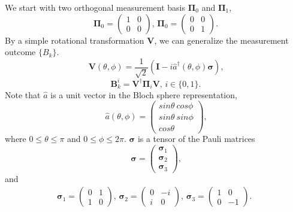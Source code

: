 \documentclass[%
 reprint,
 amsmath,amssymb,
 aps,
]{revtex4-1}
\begin{document}
We start with two orthogonal measurement basis $\boldsymbol{\Pi}_0$ and $\boldsymbol{\Pi}_1$,
\begin{equation}
\boldsymbol{\Pi}_0 = 
\left( \begin{array}{cc}
1 & 0 \\
0 & 0 \end{array} \right) \text{, }
\boldsymbol{\Pi}_0 = 
\left( \begin{array}{cc}
0 & 0 \\
0 & 1 \end{array} \right) \text{.}
\end{equation}
\noindent By a simple rotational transformation $\textbf{V}$, we can generalize the measurement outcome $\{B_k\}$.
\begin{equation}
\textbf{V}(\theta,\phi) = \frac{1}{\sqrt{2}} (\textbf{I} - i \hat{a}^{\dagger}(\theta,\phi) \boldsymbol{\sigma} ) \text{,}
\end{equation}
\begin{equation}
\textbf{B}_k^i  = \textbf{V}^{\dagger} \boldsymbol{\Pi}_i \textbf{V} \text{, } i \in \{0, 1\} \text{.}
\end{equation}
\noindent Note that $\hat{a}$ is a unit vector in the Bloch sphere representation,
\begin{equation}
\hat{a}(\theta,\phi) = \left( \begin{array}{c}
sin \theta \  cos \phi \\
sin \theta \  sin \phi \\
cos \theta
\end{array} \right) \text{,}
\end{equation}
\noindent where $0 \le \theta \le \pi$ and $0 \le \phi \le 2\pi$. $\boldsymbol{\sigma}$ is a tensor of the Pauli matrices
\begin{equation}
\boldsymbol{\sigma} = \left( \begin{array}{c}
\boldsymbol{\sigma}_1 \\
\boldsymbol{\sigma}_2 \\
\boldsymbol{\sigma}_3
\end{array} \right) \text{,}
\end{equation}
\noindent and
\begin{eqnarray}
\boldsymbol{\sigma}_1 = \left( \begin{array}{cc}
0 & 1 \\
1 & 0
\end{array} \right) \text{, }
\boldsymbol{\sigma}_2 = \left( \begin{array}{cc}
0 & -i \\
i & 0
\end{array} \right) \text{, }
\boldsymbol{\sigma}_3 = \left( \begin{array}{cc}
1 & 0 \\
0 & -1
\end{array} \right) \text{. }
\end{eqnarray}
\end{document}
